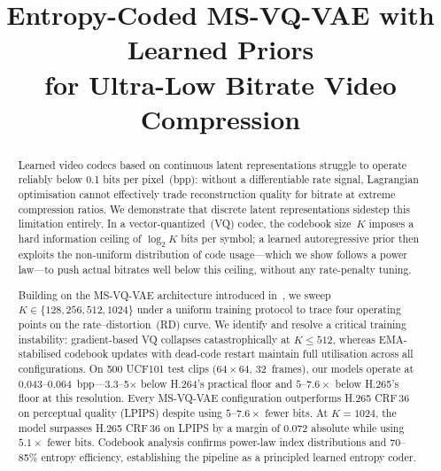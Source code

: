 \documentclass[sigconf, screen, review, anonymous]{acmart}
\begin{document}
\title{Entropy-Coded MS-VQ-VAE with Learned Priors\\for Ultra-Low Bitrate Video Compression}


\begin{abstract}
Learned video codecs based on continuous latent representations struggle
to operate reliably below 0.1 bits per pixel~(bpp): without a
differentiable rate signal, Lagrangian optimisation cannot effectively
trade reconstruction quality for bitrate at extreme compression ratios.
We demonstrate that discrete latent representations sidestep
this limitation entirely. In a vector-quantized~(VQ) codec, the
codebook size~$K$ imposes a hard information ceiling of $\log_2 K$ bits
per symbol; a learned autoregressive prior then exploits the
non-uniform distribution of code usage---which we show follows a power
law---to push actual bitrates well below this ceiling, without any
rate-penalty tuning.

Building on the MS-VQ-VAE architecture introduced in~\cite{kotthapalli2026msvqvae},
we sweep $K \in \{128, 256, 512, 1024\}$ under a uniform training
protocol to trace four operating points on the rate--distortion~(RD)
curve. We identify and resolve a critical training instability:
gradient-based VQ collapses catastrophically at $K \leq 512$, whereas
EMA-stabilised codebook updates with dead-code restart maintain full
utilisation across all configurations. On 500 UCF101 test clips
($64\!\times\!64$, 32~frames), our models operate at 0.043--0.064~bpp---3.3--5$\times$
below H.264's practical floor and $5$--$7.6\times$ below H.265's floor
at this resolution. Every MS-VQ-VAE configuration outperforms H.265
CRF\,36 on perceptual quality (LPIPS) despite using $5$--$7.6\times$
fewer bits. At $K{=}1024$, the model surpasses H.265 CRF\,36 on LPIPS
by a margin of 0.072 absolute while using $5.1\times$ fewer bits. Codebook analysis confirms
power-law index distributions and 70--85\% entropy efficiency,
establishing the pipeline as a principled learned entropy coder.
\end{abstract}
\end{document}
